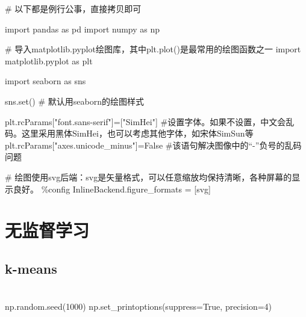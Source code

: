 \documentclass[
  letterpaper,
  DIV=11,
  numbers=noendperiod]{scrreprt}
\newenvironment{Shaded}{\begin{snugshade}}{\end{snugshade}}
\newcommand{\BuiltInTok}[1]{\textcolor[rgb]{0.00,0.23,0.31}{#1}}
\newcommand{\CommentTok}[1]{\textcolor[rgb]{0.37,0.37,0.37}{#1}}
\newcommand{\DecValTok}[1]{\textcolor[rgb]{0.68,0.00,0.00}{#1}}
\newcommand{\ImportTok}[1]{\textcolor[rgb]{0.00,0.46,0.62}{#1}}
\newcommand{\NormalTok}[1]{\textcolor[rgb]{0.00,0.23,0.31}{#1}}
\newcommand{\OperatorTok}[1]{\textcolor[rgb]{0.37,0.37,0.37}{#1}}
\newcommand{\StringTok}[1]{\textcolor[rgb]{0.13,0.47,0.30}{#1}}
\newcommand{\VariableTok}[1]{\textcolor[rgb]{0.07,0.07,0.07}{#1}}
\begin{document}
\begin{Shaded}
\begin{Highlighting}[]
\CommentTok{\# 以下都是例行公事，直接拷贝即可}

\ImportTok{import}\NormalTok{ pandas }\ImportTok{as}\NormalTok{ pd}
\ImportTok{import}\NormalTok{ numpy }\ImportTok{as}\NormalTok{ np }

\CommentTok{\# 导入matplotlib.pyplot绘图库，其中plt.plot()是最常用的绘图函数之一}
\ImportTok{import}\NormalTok{ matplotlib.pyplot }\ImportTok{as}\NormalTok{ plt }

\ImportTok{import}\NormalTok{ seaborn }\ImportTok{as}\NormalTok{ sns}

\NormalTok{sns.}\BuiltInTok{set}\NormalTok{() }\CommentTok{\# 默认用seaborn的绘图样式}

\NormalTok{plt.rcParams[}\StringTok{"font.sans{-}serif"}\NormalTok{]}\OperatorTok{=}\NormalTok{[}\StringTok{"SimHei"}\NormalTok{] }\CommentTok{\#设置字体。如果不设置，中文会乱码。这里采用黑体SimHei，也可以考虑其他字体，如宋体SimSun等}
\NormalTok{plt.rcParams[}\StringTok{"axes.unicode\_minus"}\NormalTok{]}\OperatorTok{=}\VariableTok{False} \CommentTok{\#该语句解决图像中的“{-}”负号的乱码问题}

\CommentTok{\# 绘图使用\textquotesingle{}svg\textquotesingle{}后端：svg是矢量格式，可以任意缩放均保持清晰，各种屏幕的显示良好。}
\OperatorTok{\%}\NormalTok{config InlineBackend.figure\_formats }\OperatorTok{=}\NormalTok{ [}\StringTok{\textquotesingle{}svg\textquotesingle{}}\NormalTok{]}
\end{Highlighting}
\end{Shaded}

\hypertarget{ux65e0ux76d1ux7763ux5b66ux4e60}{%
\section{无监督学习}\label{ux65e0ux76d1ux7763ux5b66ux4e60}}

\hypertarget{k-means}{%
\subsection{k-means}\label{k-means}}

\hypertarget{section}{%
\section{}\label{section}}

\begin{Shaded}
\begin{Highlighting}[]
\NormalTok{np.random.seed(}\DecValTok{1000}\NormalTok{) }
\NormalTok{np.set\_printoptions(suppress}\OperatorTok{=}\VariableTok{True}\NormalTok{, precision}\OperatorTok{=}\DecValTok{4}\NormalTok{) }
\end{Highlighting}
\end{Shaded}
\end{document}
